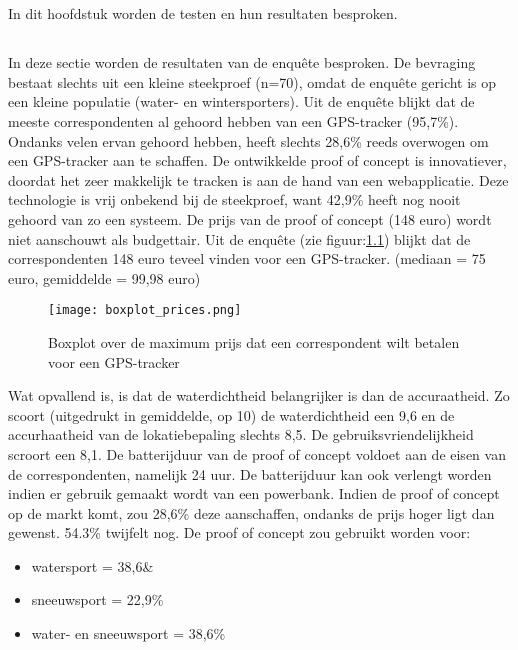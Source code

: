 \chapter{}
\label{ch:resultaten}
In dit hoofdstuk worden de testen en hun resultaten besproken.
\section{}
In deze sectie worden de resultaten van de enquête besproken.
\newline
De bevraging bestaat slechts uit een kleine steekproef (n=70), omdat de enquête gericht is op een kleine populatie (water- en wintersporters). Uit de enquête blijkt dat de meeste correspondenten al gehoord hebben van een GPS-tracker (95,7\%). Ondanks velen ervan gehoord hebben, heeft slechts 28,6\% reeds overwogen om een GPS-tracker aan te schaffen. De ontwikkelde proof of concept is innovatiever, doordat het zeer makkelijk te tracken is aan de hand van een webapplicatie. Deze technologie is vrij onbekend bij de steekproef, want 42,9\% heeft nog nooit gehoord van zo een systeem. 
\newline
De prijs van de proof of concept (148 euro) wordt niet aanschouwt als budgettair. Uit de enquête (zie figuur:\ref{graph:price}) blijkt dat de correspondenten 148 euro teveel vinden voor een GPS-tracker. (mediaan = 75 euro, gemiddelde = 99,98 euro) 
\begin{figure}
	\texttt{[image: boxplot\_prices.png]}
	\caption{Boxplot over de maximum prijs dat een correspondent wilt betalen voor een GPS-tracker}
	\label{graph:price}
\end{figure}
\newline
Wat opvallend is, is dat de waterdichtheid belangrijker is dan de accuraatheid. Zo scoort (uitgedrukt in gemiddelde, op 10) de waterdichtheid een 9,6 en de accurhaatheid van de lokatiebepaling slechts 8,5. De gebruiksvriendelijkheid scroort een 8,1. 
\newline
De batterijduur van de proof of concept voldoet aan de eisen van de correspondenten, namelijk 24 uur. De batterijduur kan ook verlengt worden indien er gebruik gemaakt wordt van een powerbank.
\newline
Indien de proof of concept op de markt komt, zou 28,6\% deze aanschaffen, ondanks de prijs hoger ligt dan gewenst. 54.3\% twijfelt nog. 
\newline
De proof of concept zou gebruikt worden voor:
\begin{itemize}
	\item watersport = 38,6\&
	\item sneeuwsport = 22,9\%
	\item water- en sneeuwsport = 38,6\%
\end{itemize}
